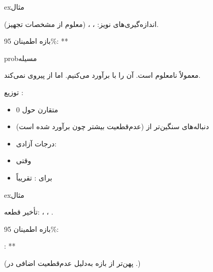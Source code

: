 \begin{PSbox}[unbreakable]{ex}{مثال}

اندازه‌گیری‌های نویز: ، ،  (معلوم از مشخصات تجهیز).

بازه اطمینان 95\%: **

\end{PSbox}


\begin{PSbox}[unbreakable]{prob}{مسیله}

معمولاً \lr{$\sigma$} نامعلوم است. آن را با  برآورد می‌کنیم. اما  از  پیروی نمی‌کند.

\end{PSbox}



توزیع :

\begin{itemize}
\tightlist
\item
  متقارن حول 0
\item
  دنباله‌های سنگین‌تر از  (عدم‌قطعیت بیشتر چون  برآورد شده است)
\item
  درجات آزادی: 
\item
  وقتی 
\item
  برای : تقریباً 
\end{itemize}



\begin{PSbox}[unbreakable]{ex}{مثال}

تأخیر قطعه: ، ، .

بازه اطمینان 95\%: 

: **

(پهن‌تر از بازه  به‌دلیل عدم‌قطعیت اضافی در .)

\end{PSbox}

